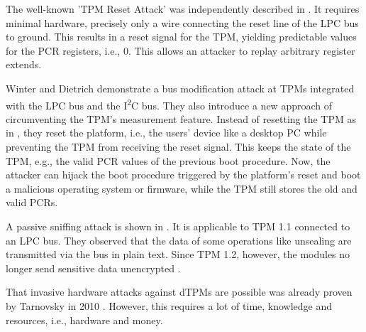 The well-known 'TPM Reset Attack' was independently described in \cite{kauerBernhard,sparks2007}. It requires minimal hardware, precisely only a wire connecting the reset line of the LPC bus \cite{lpc} to ground. This results in a reset signal for the TPM, yielding predictable values for the PCR registers, i.e., 0. This allows an attacker to replay arbitrary register extends.

Winter and Dietrich \cite{Winter2013} demonstrate a bus modification attack at TPMs integrated with the LPC bus and the I\textsuperscript{2}C bus. They also introduce a new approach of circumventing the TPM's measurement feature. Instead of resetting the TPM as in \cite{kauerBernhard,sparks2007}, they reset the platform, i.e., the users' device like a desktop PC while preventing the TPM from receiving the reset signal. This keeps the state of the TPM, e.g., the valid PCR values of the previous boot procedure. Now, the attacker can hijack the boot procedure triggered by the platform's reset and boot a malicious operating system or firmware, while the TPM still stores the old and valid PCRs.


A passive sniffing attack is shown in \cite{Kursawe2005AnalyzingTP}. It is applicable to TPM 1.1 connected to an LPC bus. They observed that the data of some operations like unsealing are transmitted via the bus in plain text. Since TPM 1.2, however, the modules no longer send sensitive data unencrypted \cite{Winter2013}.

That invasive hardware attacks against dTPMs are possible was already proven by Tarnovsky in 2010 \cite{tarnovsky}. However, this requires a lot of time, knowledge and resources, i.e., hardware and money.


